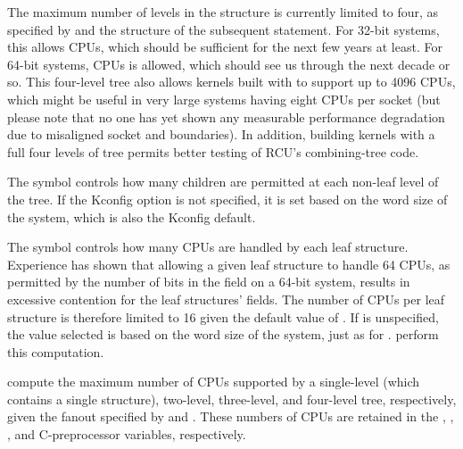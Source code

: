 \begin{fcvref}
The maximum number of levels in the  structure is currently
limited to four, as specified by  %
and the structure of the
subsequent  statement.
For 32-bit systems, this allows
 CPUs, which should be sufficient for the next few
years at least.
For 64-bit systems,  CPUs is
allowed, which should see us through the next decade or so.
This
four-level tree also allows kernels built with 
to support up to 4096 CPUs, which might be useful in very large systems
having eight CPUs per socket (but please note that no one has yet shown
any measurable performance degradation due to misaligned socket and
 boundaries).
In addition, building kernels with a full four
levels of  tree permits better testing of RCU's
combining-tree code.

The  symbol controls how many children are permitted at
each non-leaf level of the  tree.
If the
 Kconfig option is not specified, it is set based
on the word size of the system, which is also the Kconfig default.

The  symbol controls how many CPUs are handled by
each leaf  structure.
Experience has shown that allowing a
given leaf  structure to handle 64 CPUs, as permitted by the
number of bits in the  field on a 64-bit system, results in
excessive contention for the leaf  structures' 
fields.
The number of CPUs per leaf  structure is therefore
limited to 16 given the default value of .
If
 is unspecified, the value selected is based
on the word size of the system, just as for .
perform this computation.

compute the maximum number of CPUs supported by a
single-level (which contains a single  structure),
two-level, three-level, and four-level  tree, respectively,
given the fanout specified by  and .
These numbers of CPUs are retained in the ,
, , and  C-preprocessor
variables, respectively.


\end{fcvref}
